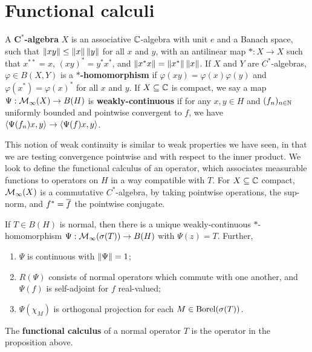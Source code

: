 \documentclass[10pt]{amsart}
\begin{document}
\section{Functional calculi}
A \textbf{$\mathbf{C^*}$-algebra} $X$ is an associative $\mathbb{C}$-algebra with unit $e$ and a Banach space, such that $\left\| xy \right\| \leq \left\| x \right\|\left\| y \right\|$ for all $x$ and $y$, with an antilinear map $* : X \to X$ such that $x^{**} = x$, $(xy)^* = y^*x^*$, and $\left\| x^*x \right\| = \left\| x^* \right\|\left\| x \right\|$. If $X$ and $Y$ are $C^*$-algebras, $\varphi \in B(X, Y)$ is a \textbf{$\mathbf{*}$-homomorphism} if $\varphi(xy) = \varphi(x)\varphi(y)$ and $\varphi(x^*) = \varphi(x)^*$ for all $x$ and $y$. %
If $X \subseteq \mathbb{C}$ is compact, we say a map $\Psi : \mathcal{M}_\infty(X) \to B(H)$ is \textbf{weakly-continuous} if for any $x, y \in H$ and $(f_n)_{n \in \mathbb{N}}$ uniformly bounded and pointwise convergent to $f$, we have $\left\langle \Psi(f_n)x, y \right\rangle \to \left\langle \Psi(f)x, y \right\rangle$.

This notion of weak continuity is similar to weak properties we have seen, in that we are testing convergence pointwise and with respect to the inner product. We look to define the functional calculus of an operator, which associates measurable functions to operators on $H$ in a way compatible with $T$. For $X \subseteq \mathbb{C}$ compact, $\mathcal{M}_\infty(X)$ is a commutative $C^*$-algebra, by taking pointwise operations, the sup-norm, and $f^* = \overline{f}$ the pointwise conjugate.
\begin{proposition}\label{funccalc}
    If $T \in B(H)$ is normal, then there is a unique weakly-continuous $*$-homomorphism $\Psi : \mathcal{M}_\infty(\sigma(T)) \to B(H)$ with $\Psi(z) = T$. Further, 
    \begin{enumerate}
        \item $\Psi$ is continuous with $\left\| \Psi \right\| = 1$;
        \item $R(\Psi)$ consists of normal operators which commute with one another, and $\Psi(f)$ is self-adjoint for $f$ real-valued;
        \item $\Psi(\chi_M)$ is orthogonal projection for each $M \in \operatorname{Borel}(\sigma(T))$.
    \end{enumerate}
\end{proposition}
\begin{definition}
    The \textbf{functional calculus} of a normal operator $T$ is the operator in the proposition above.
\end{definition}
\end{document}
